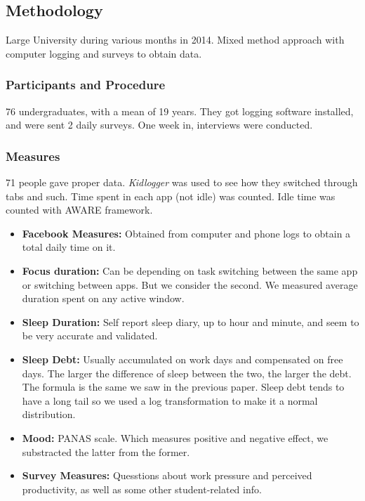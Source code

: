\documentclass{IEEEtran}
\begin{document}
    \subsection{Methodology}
      Large University during various months in 2014. Mixed method approach with computer logging and surveys to obtain data.
      \subsubsection{Participants and Procedure}
        76 undergraduates, with a mean of 19 years. They got logging software installed, and were sent 2 daily surveys. One week in, interviews were conducted.
      \subsubsection{Measures}
        71 people gave proper data. \textit{Kidlogger} was used to see how they switched through tabs and such. Time spent in each app (not idle) was counted. Idle time was counted with AWARE framework. 
        \begin{itemize}
          \item \textbf{Facebook Measures:} Obtained from computer and phone logs to obtain a total daily time on it. 
          \item \textbf{Focus duration:} Can be depending on task switching between the same app or switching between apps. But we consider the second. We measured average duration spent on any active window.
          \item \textbf{Sleep Duration:} Self report sleep diary, up to hour and minute, and seem to be very accurate and validated. 
          \item \textbf{Sleep Debt:} Usually accumulated on work days and compensated on free days. The larger the difference of sleep between the two, the larger the debt. The formula is the same we saw in the previous paper. Sleep debt tends to have a long tail so we used a log transformation to make it a normal distribution.
          \item \textbf{Mood:} PANAS scale. Which measures positive and negative effect, we substracted the latter from the former.
          \item \textbf{Survey Measures:} Quesstions about work pressure and perceived productivity, as well as some other student-related info.
        \end{itemize}
\end{document}
